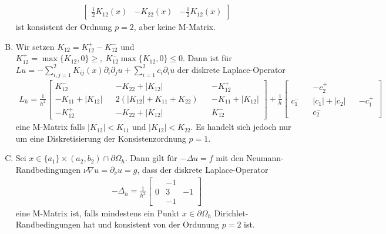 \begin{Anwendung}
\begin{enumerate}[A)]
\begin{eqnarray*}
\begin{bmatrix}
                  \frac{1}{2} K_{12}(x) & -K_{22}(x) & -\frac{1}{2} K_{12}(x)
              \end{bmatrix}
	    \end{eqnarray*}
	    ist konsistent der Ordnung $p = 2$, aber keine M-Matrix.
	\item
	    Wir setzen $K_{12} = K_{12}^+ - K_{12}^-$ und
	    $K_{12}^+ = \max \{K_{12}, 0\} \ge, \
	    K_{12}^- \max \{K_{12}, 0\} \le 0$. Dann ist für
	    $Lu = - \sum_{i, j=1}^2 K_{ij}(x) \partial_i \partial_j u
	    + \sum_{i=1}^2 c_i \partial_i u$ der diskrete Laplace-Operator
	    \begin{eqnarray*}
              L_h
            = \frac{1}{h^2}\left[
              \begin{smallmatrix}
                  K_{12}^- & & -K_{22} + |K_{12}| & & -K_{12}^+ \\
                  -K_{11} + |K_{12}| & & 2 (|K_{12}| + K_{11} + K_{22})
                  & & -K_{11} +|K_{12}| \\
                  -K_{12}^+ & & -K_{22} + |K_{12}| & & K_{12}^-
              \end{smallmatrix}\right]
            + \frac{1}{h}\left[
              \begin{smallmatrix}
                  & & -c_2^+ & & \\
                  c_1^- & & |c_1| + |c_2| & & -c_1^+ \\
                  & & c_2^- & &
              \end{smallmatrix}\right]
	    \end{eqnarray*}
	    eine M-Matrix falls $|K_{12}| < K_{11}$ und $|K_{12}| < K_{22}$.
	    Es handelt sich jedoch nur um eine Diskretisierung der Konsistenzordnung
        $p = 1$.
	\item
	    Sei $x \in \{a_1\} \times (a_2, b_2) \cap \partial \Omega_h$.
	    Dann gilt für $-\Delta u = f$ mit den Neumann-Randbedingungen
	    $\nu \nabla u = \partial_\nu u = g$, dass der
	    diskrete Laplace-Operator
	    \begin{eqnarray*}
            -\Delta_h = \frac{1}{h^2}
                        \begin{bmatrix}
                            & -1 & \\
                            0 & 3 & -1 \\
                            & -1 &
                        \end{bmatrix}
	    \end{eqnarray*}
	    eine M-Matrix ist, falls mindestens ein Punkt $x \in \partial
	    \Omega_h$ Dirichlet-Randbedingungen hat und konsistent von der
	    Ordunung $p=2$ ist.
    \end{enumerate}
\end{Anwendung}


